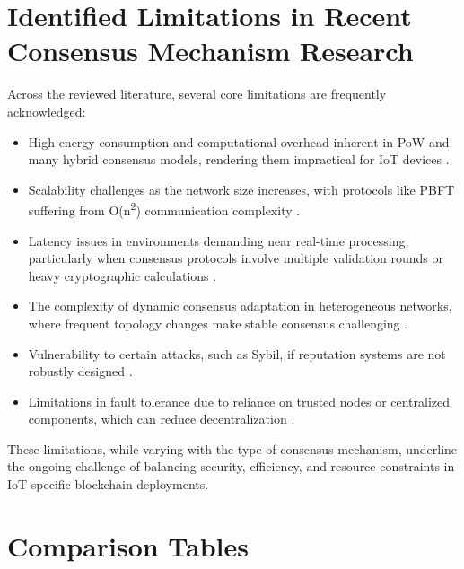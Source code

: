 \documentclass[12pt,onecolumn]{IEEEtran} %
\begin{document}
\section{Identified Limitations in Recent Consensus Mechanism Research}
Across the reviewed literature, several core limitations are frequently acknowledged:
\begin{itemize}
    \item High energy consumption and computational overhead inherent in PoW and many hybrid consensus models, rendering them impractical for IoT devices \cite{ali2022blockchainenabledarchitecture, khan2022asurveyand}.
    \item Scalability challenges as the network size increases, with protocols like PBFT suffering from O(n\textsuperscript{2}) communication complexity \cite{khan2022asurveyand, ali2022blockchainenabledarchitecture}.
    \item Latency issues in environments demanding near real-time processing, particularly when consensus protocols involve multiple validation rounds or heavy cryptographic calculations \cite{guo2022ahierarchicaland, morais2023surveyonintegration}.
    \item The complexity of dynamic consensus adaptation in heterogeneous networks, where frequent topology changes make stable consensus challenging \cite{alam2023anoverviewof, guru2023asurveyon}.
    \item Vulnerability to certain attacks, such as Sybil, if reputation systems are not robustly designed \cite{guru2023asurveyon, platt2023sybilinthe}.
    \item Limitations in fault tolerance due to reliance on trusted nodes or centralized components, which can reduce decentralization \cite{haque2024ascalableblockchain, morais2023surveyonintegration}.
\end{itemize}

These limitations, while varying with the type of consensus mechanism, underline the ongoing challenge of balancing security, efficiency, and resource constraints in IoT-specific blockchain deployments.

\section{Comparison Tables}
\end{document}
